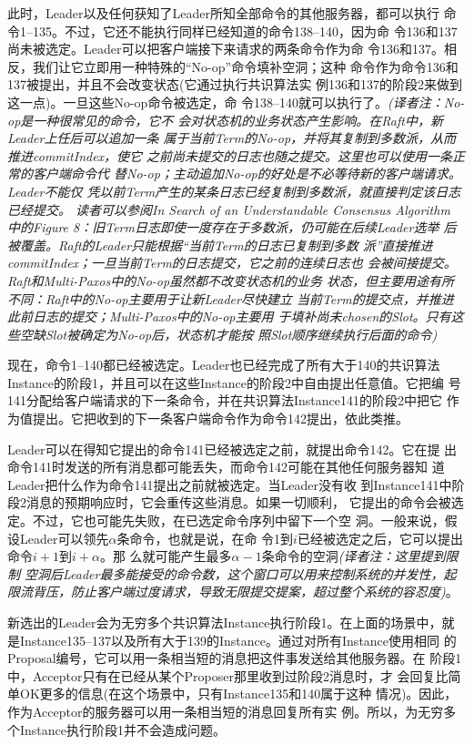 此时，Leader以及任何获知了Leader所知全部命令的其他服务器，都可以执行
命令1--135。不过，它还不能执行同样已经知道的命令138--140，因为命
令136和137尚未被选定。Leader可以把客户端接下来请求的两条命令作为命
令136和137。相反，我们让它立即用一种特殊的“No-op”命令填补空洞；这种
命令作为命令136和137被提出，并且不会改变状态(它通过执行共识算法实
例136和137的阶段2来做到这一点)。一旦这些No-op命令被选定，命
令138--140就可以执行了。\emph{(译者注：No-op是一种很常见的命令，它不
会对状态机的业务状态产生影响。在Raft中，新Leader上任后可以追加一条
属于当前Term的No-op，并将其复制到多数派，从而推进commitIndex，使它
之前尚未提交的日志也随之提交。这里也可以使用一条正常的客户端命令代
替No-op；主动追加No-op的好处是不必等待新的客户端请求。Leader不能仅
凭以前Term产生的某条日志已经复制到多数派，就直接判定该日志已经提交。
读者可以参阅In Search of an Understandable Consensus Algorithm
中的Figure 8：旧Term日志即使一度存在于多数派，仍可能在后续Leader选举
后被覆盖。Raft的Leader只能根据“当前Term的日志已复制到多数
派”直接推进commitIndex；一旦当前Term的日志提交，它之前的连续日志也
会被间接提交。Raft和Multi-Paxos中的No-op虽然都不改变状态机的业务
状态，但主要用途有所不同：Raft中的No-op主要用于让新Leader尽快建立
当前Term的提交点，并推进此前日志的提交；Multi-Paxos中的No-op主要用
于填补尚未chosen的Slot。只有这些空缺Slot被确定为No-op后，状态机才能按
照Slot顺序继续执行后面的命令)}

现在，命令1--140都已经被选定。Leader也已经完成了所有大于140的共识算法
Instance的阶段1，并且可以在这些Instance的阶段2中自由提出任意值。它把编
号141分配给客户端请求的下一条命令，并在共识算法Instance141的阶段2中把它
作为值提出。它把收到的下一条客户端命令作为命令142提出，依此类推。

Leader可以在得知它提出的命令141已经被选定之前，就提出命令142。它在提
出命令141时发送的所有消息都可能丢失，而命令142可能在其他任何服务器知
道Leader把什么作为命令141提出之前就被选定。当Leader没有收
到Instance141中阶段2消息的预期响应时，它会重传这些消息。如果一切顺利，
它提出的命令会被选定。不过，它也可能先失败，在已选定命令序列中留下一个空
洞。一般来说，假设Leader可以领先\(\alpha\)条命令，也就是说，在命
令1到\(i\)已经被选定之后，它可以提出命令\(i+1\)到\(i+\alpha\)。那
么就可能产生最多\(\alpha-1\)条命令的空洞\emph{(译者注：这里提到限制
空洞后Leader最多能接受的命令数，这个窗口可以用来控制系统的并发性，起
限流背压，防止客户端过度请求，导致无限提交提案，超过整个系统的容忍度)}。

新选出的Leader会为无穷多个共识算法Instance执行阶段1。在上面的场景中，就
是Instance135--137以及所有大于139的Instance。通过对所有Instance使用相同
的Proposal编号，它可以用一条相当短的消息把这件事发送给其他服务器。在
阶段1中，Acceptor只有在已经从某个Proposer那里收到过阶段2消息时，才
会回复比简单OK更多的信息(在这个场景中，只有Instance135和140属于这种
情况)。因此，作为Acceptor的服务器可以用一条相当短的消息回复所有实
例。所以，为无穷多个Instance执行阶段1并不会造成问题。

